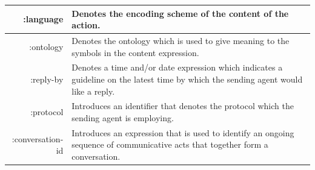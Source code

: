\documentclass[0main.tex]{subfiles}
\begin{document}
\begin{table}[htbp]
\begin{tabularx}{.8\textwidth}{>{\ttfamily}rX}
        :language                                                          & Denotes the encoding scheme of the content of the
                                                                            action. \\\midrule
        :ontology                                                          & Denotes the ontology which is used to give 
                                                                            meaning to the symbols in the content expression. \\\midrule
        :reply-by                                                          & Denotes a time and/or date expression which
                                                                            indicates a guideline on the latest time by which the
                                                                            sending agent would like a reply. \\\midrule
        :protocol                                                          & Introduces an identifier that denotes the protocol
                                                                            which the sending agent is employing. \\\midrule
        :conversation-id                                                   & Introduces an expression that is used to identify an
                                                                            ongoing sequence of communicative acts that
                                                                            together form a conversation. \\\bottomrule
    \end{tabularx}
    \label{message-parameters}
\end{table}
\clearpage
\end{document}
